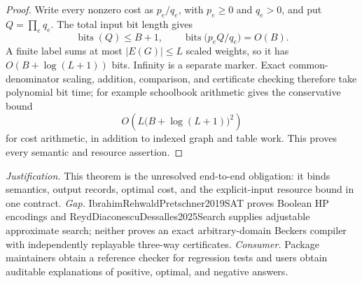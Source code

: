\documentclass{article}
\begin{document}
\begin{proof}
Write every nonzero cost as \(p_e/q_e\), with \(p_e\ge0\) and \(q_e>0\), and put \(Q=\prod_e q_e\).  The total input bit length gives
\[
 \operatorname{bits}(Q)\le B+1,
 \qquad
 \operatorname{bits}\bigl(p_eQ/q_e\bigr)=O(B).
\]
A finite label sums at most \(|E(G)|\le L\) scaled weights, so it has \(O(B+\log(L+1))\) bits.  Infinity is a separate marker.  Exact common-denominator scaling, addition, comparison, and certificate checking therefore take polynomial bit time; for example schoolbook arithmetic gives the conservative bound
\[
 O\!\left(L\bigl(B+\log(L+1)\bigr)^2\right)
\]
for cost arithmetic, in addition to indexed graph and table work.  This proves every semantic and resource assertion.
\end{proof}
\par\smallskip\noindent \textit{Justification.} This theorem is the unresolved end-to-end obligation: it binds semantics, output records, optimal cost, and the explicit-input resource bound in one contract. \textit{Gap.} IbrahimRehwaldPretschner2019SAT proves Boolean HP encodings and ReydDiaconescuDessalles2025Search supplies adjustable approximate search; neither proves an exact arbitrary-domain Beckers compiler with independently replayable three-way certificates. \textit{Consumer.} Package maintainers obtain a reference checker for regression tests and users obtain auditable explanations of positive, optimal, and negative answers.
\end{document}
